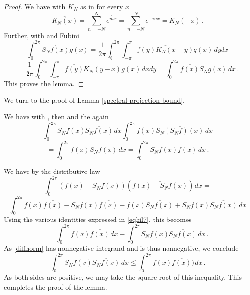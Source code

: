 \begin{proof}
  We have with $K_N$ as in  for every $x$
  \begin{equation}
      \overline{K_N(x)}=\sum_{n=-N}^N\overline{ e^{in x}}=
      {\sum_{n=-N}^N e^{-in x}}=K_N(-x)\, .
  \end{equation}
 Further, with  and Fubini
\begin{equation*}
\int_0^{2\pi} \overline{S_Nf(x)} g(x)
= \frac 1{2\pi} \int_0^{2\pi} \int_{-\pi}^{\pi}\overline{f(y) K_N(x-y)} g(x)\, dy dx
 \end{equation*}
 \begin{equation}
=
\frac 1{2\pi} \int_0^{2\pi} \int_{-\pi}^{\pi}\overline{f(y)} K_N(y-x)
g(x)\, dx dy
=\int_0^{2\pi} \overline{f(x)} S_Ng(x)\, dx
\, .
\end{equation}
 This proves the lemma.
\end{proof}


We turn to the proof of Lemma
\ref{spectral-projection-bound}.

We have with , then  and the  again
\begin{equation*}
 \int_0^{2\pi} S_Nf(x)\overline{S_Nf(x)}\, dx
 \int_0^{2\pi} f(x)\overline{S_N(S_Nf)(x)}\, dx
\end{equation*}
\begin{equation}\label{eqhil7}
 =\int_0^{2\pi} f(x)\overline{S_Nf(x)}\, dx=
 \int_0^{2\pi} S_N f(x)\overline{f(x)}\, dx\, .
\end{equation}

We have by the distributive law
\begin{equation}\label{diffnorm}
    \int_0^{2\pi} (f(x)-S_Nf(x))(\overline{f(x)-S_Nf(x)})\, dx=
\end{equation}
\begin{equation*}
 \int_0^{2\pi} f(x)\overline{f(x)}
    -S_Nf(x)\overline{f(x)}
   -f(x)\overline{S_Nf(x)}
     + S_Nf(x)\overline{S_Nf(x)}\, dx
\end{equation*}
Using the various identities expressed in \eqref{eqhil7}, this becomes
\begin{equation}
 =\int_0^{2\pi} f(x)\overline{f(x)}\, dx
    -
   \int_0^{2\pi} S_Nf(x)\overline{S_Nf(x)}\, dx\, .
\end{equation}
As \eqref{diffnorm} has nonnegative integrand and is thus nonnegative, we conclude
\begin{equation}
  \int_0^{2\pi} S_Nf(x)\overline{S_Nf(x)}\, dx\le
 \int_0^{2\pi} f(x)\overline{f(x)})\, dx\, .
\end{equation}
As both sides are positive, we may take the square root of this inequality.
This completes the proof of the lemma.





